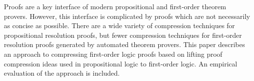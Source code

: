 Proofs are a key interface of modern propositional and first-order theorem provers. However, this interface is complicated by proofs which are not necessarily as concise as possible.
There are a wide variety of compression techniques for propositional resolution proofs, but fewer compression techniques for first-order resolution proofs generated by automated theorem provers.
This paper describes an approach to compressing first-order logic proofs based on lifting proof compression ideas used in propositional logic to first-order logic. 
An empirical evaluation of the approach is included.





